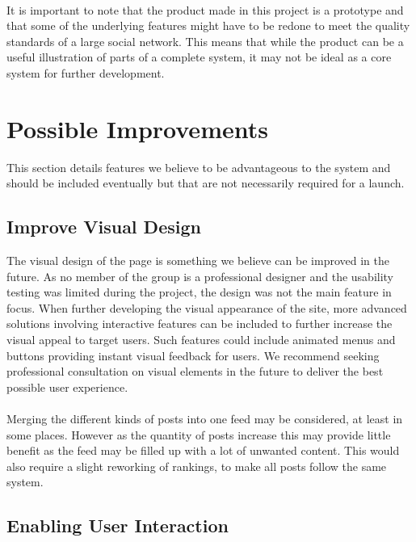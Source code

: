 \paragraph{} It is important to note that the product made in this project is a prototype and that some of the underlying features might have to be redone to meet the quality standards of a large social network. This means that while the product can be a useful illustration of parts of a complete system, it may not be ideal as a core system for further development.

\section{Possible Improvements}
\label{sec:FurtherImprovements}

This section details features we believe to be advantageous to the system and should be included eventually but that are not necessarily required for a launch.

\subsection{Improve Visual Design}
\label{subsec:FurtherImprovementsVisDesign}

The visual design of the page is something we believe can be improved in the future. As no member of the group is a professional designer and the usability testing was limited during the project, the design was not the main feature in focus. When further developing the visual appearance of the site, more advanced solutions involving interactive features can be included to further increase the visual appeal to target users. Such features could include animated menus and buttons providing instant visual feedback for users. We recommend seeking professional consultation on visual elements in the future to deliver the best possible user experience.
\paragraph{} Merging the different kinds of posts into one feed may be considered, at least in some places. However as the quantity of posts increase this may provide little benefit as the feed may be filled up with a lot of unwanted content. This would also require a slight reworking of rankings, to make all posts follow the same system.

\subsection{Enabling User Interaction}
\label{subsec:FurtherImprovementsInteraction}

